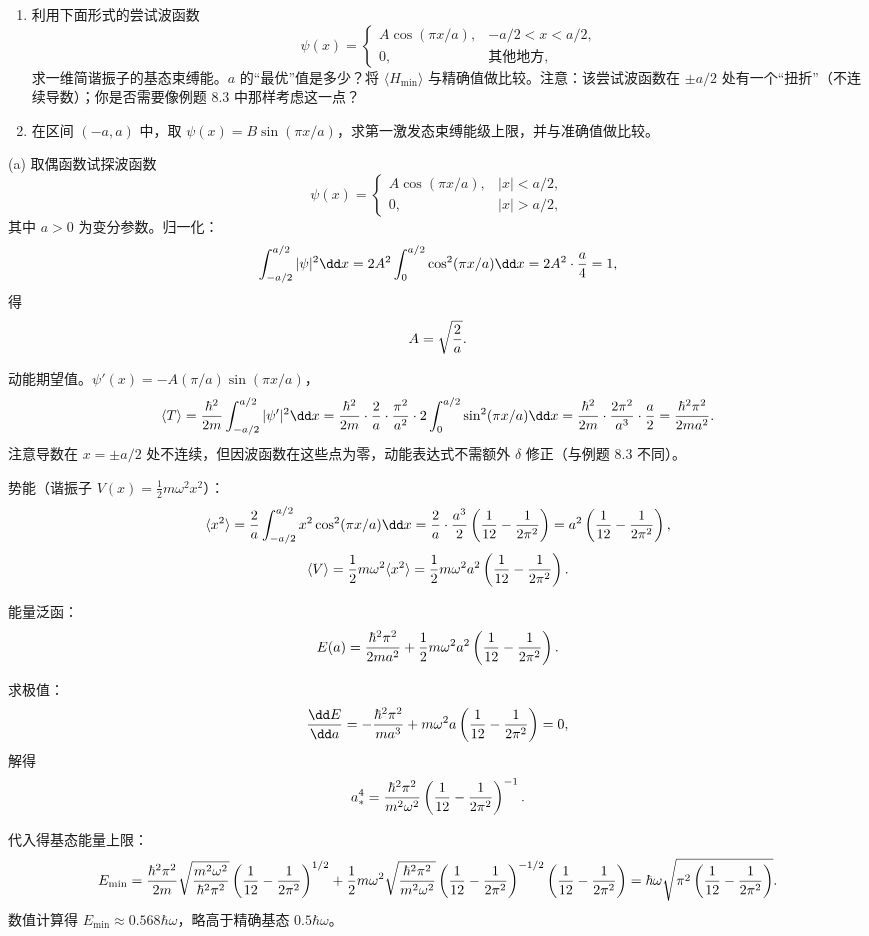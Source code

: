 \begin{question}
\begin{enumerate}
\item 利用下面形式的尝试波函数
\[
\psi(x)=\begin{cases} A\cos(\pi x/a), & -a/2<x<a/2,\\ 0, & \text{其他地方},\end{cases}
\]
求一维简谐振子的基态束缚能。$a$ 的“最优”值是多少？将 $\langle H_{\min}\rangle$ 与精确值做比较。注意：该尝试波函数在 $\pm a/2$ 处有一个“扭折”（不连续导数）；你是否需要像例题 8.3 中那样考虑这一点？
\item 在区间 $(-a,a)$ 中，取 $\psi(x)=B\sin(\pi x/a)$，求第一激发态束缚能级上限，并与准确值做比较。
\end{enumerate}
\end{question}
\begin{solution}
(a) 取偶函数试探波函数
\[
\psi(x)=\begin{cases}
A\cos(\pi x/a), & |x|<a/2,\\
0, & |x|>a/2,
\end{cases}
\]
其中 $a>0$ 为变分参数。归一化：
\[
\int_{-a/2}^{a/2}|\psi|^2\dd x=2A^2\int_0^{a/2}\cos^2(\pi x/a)\dd x
=2A^2\cdot{a\over4}=1,
\]
得
\[
A=\sqrt{2\over a}.
\]

动能期望值。$\psi'(x)=-A(\pi/a)\sin(\pi x/a)$，
\[
\langle T\rangle={\hbar^2\over2m}\int_{-a/2}^{a/2}|\psi'|^2\dd x
={\hbar^2\over2m}\cdot{2\over a}\cdot{\pi^2\over a^2}\cdot2\int_0^{a/2}\sin^2(\pi x/a)\dd x
={\hbar^2\over2m}\cdot{2\pi^2\over a^3}\cdot{a\over2}
={\hbar^2\pi^2\over2ma^2}.
\]
注意导数在 $x=\pm a/2$ 处不连续，但因波函数在这些点为零，动能表达式不需额外 $\delta$ 修正（与例题 8.3 不同）。

势能（谐振子 $V(x)=\frac12m\omega^2x^2$）：
\[
\langle x^2\rangle={2\over a}\int_{-a/2}^{a/2}x^2\cos^2(\pi x/a)\dd x
={2\over a}\cdot{a^3\over2}\left({1\over12}-{1\over2\pi^2}\right)
=a^2\left({1\over12}-{1\over2\pi^2}\right),
\]
\[
\langle V\rangle={1\over2}m\omega^2\langle x^2\rangle
={1\over2}m\omega^2a^2\left({1\over12}-{1\over2\pi^2}\right).
\]

能量泛函：
\[
E(a)={\hbar^2\pi^2\over2ma^2}+{1\over2}m\omega^2a^2\left({1\over12}-{1\over2\pi^2}\right).
\]

求极值：
\[
{\dd E\over\dd a}=-{\hbar^2\pi^2\over ma^3}+m\omega^2a\left({1\over12}-{1\over2\pi^2}\right)=0,
\]
解得
\[
a_*^4={\hbar^2\pi^2\over m^2\omega^2}\left({1\over12}-{1\over2\pi^2}\right)^{-1}.
\]

代入得基态能量上限：
\[
E_{\min}={\hbar^2\pi^2\over2m}\sqrt{m^2\omega^2\over\hbar^2\pi^2}\left({1\over12}-{1\over2\pi^2}\right)^{1/2}
+{1\over2}m\omega^2\sqrt{\hbar^2\pi^2\over m^2\omega^2}\left({1\over12}-{1\over2\pi^2}\right)^{-1/2}\left({1\over12}-{1\over2\pi^2}\right)
=\hbar\omega\sqrt{\pi^2\left({1\over12}-{1\over2\pi^2}\right)}.
\]
数值计算得 $E_{\min}\approx0.568\hbar\omega$，略高于精确基态 $0.5\hbar\omega$。


\end{solution}
